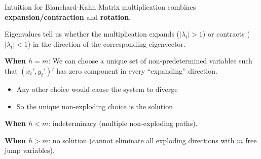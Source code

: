 \documentclass[blue]{beamer}
\begin{document}
\begin{frame}{Intuition for Blanchard-Kahn}
	Matrix multiplication combines \textbf{expansion/contraction} and \textbf{rotation}.
	
	Eigenvalues tell us whether the multiplication expands ($|\lambda_i| > 1$) or contracts ($|\lambda_i| < 1$) in the direction of the corresponding eigenvector.
	
	\textbf{When $h = m$}: We can choose a unique set of non-predetermined variables such that $(x_t', y_t')'$ has zero component in every ``expanding'' direction.
	\begin{itemize}
		\item Any other choice would cause the system to diverge
		\item So the unique non-exploding choice is the solution
	\end{itemize}
	
	\textbf{When $h < m$}: indeterminacy (multiple non-exploding paths).
	
	\textbf{When $h > m$}: no solution (cannot eliminate all exploding directions with $m$ free jump variables).
\end{frame}
\end{document}
